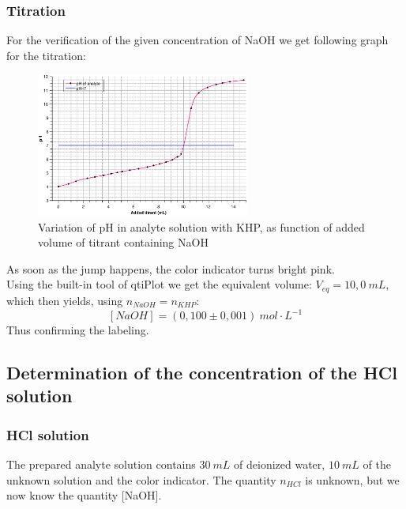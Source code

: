 \documentclass[twocolumn]{article}
\begin{document}
\subsubsection{Titration}
For the verification of the given concentration of NaOH we get following graph for the titration:
\begin{figure}[htbp]
    \centering
    \includegraphics[width=7cm]{Titration1b.eps}
    \caption{Variation of pH in analyte solution with KHP, as function of added volume of titrant containing NaOH}
    \label{fig:2}
\end{figure}
\FloatBarrier
As soon as the jump happens, the color indicator turns bright pink. \\
Using the built-in tool of qtiPlot we get the equivalent volume: $V_{eq} = 10,0 \ mL$, which then yields, using $n_{NaOH} = n_{KHP}$: 
\[ [NaOH]=(0,100 \pm 0,001) \ mol \cdot L ^{-1} \]
Thus confirming the labeling.
\subsection{Determination of the concentration of the HCl solution}
\subsubsection{HCl solution}
The prepared analyte solution contains $30 \ mL$ of deionized water, $10 \ mL$ of the unknown solution and the color indicator. The quantity $n_{HCl}$ is unknown, but we now know the quantity [NaOH].
\end{document}
